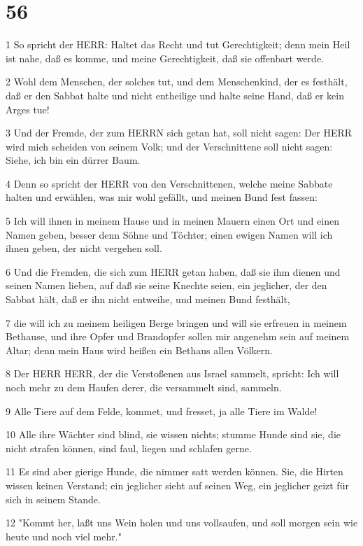 \chapter{56}

\par 1 So spricht der HERR: Haltet das Recht und tut Gerechtigkeit; denn mein Heil ist nahe, daß es komme, und meine Gerechtigkeit, daß sie offenbart werde.
\par 2 Wohl dem Menschen, der solches tut, und dem Menschenkind, der es festhält, daß er den Sabbat halte und nicht entheilige und halte seine Hand, daß er kein Arges tue!
\par 3 Und der Fremde, der zum HERRN sich getan hat, soll nicht sagen: Der HERR wird mich scheiden von seinem Volk; und der Verschnittene soll nicht sagen: Siehe, ich bin ein dürrer Baum.
\par 4 Denn so spricht der HERR von den Verschnittenen, welche meine Sabbate halten und erwählen, was mir wohl gefällt, und meinen Bund fest fassen:
\par 5 Ich will ihnen in meinem Hause und in meinen Mauern einen Ort und einen Namen geben, besser denn Söhne und Töchter; einen ewigen Namen will ich ihnen geben, der nicht vergehen soll.
\par 6 Und die Fremden, die sich zum HERR getan haben, daß sie ihm dienen und seinen Namen lieben, auf daß sie seine Knechte seien, ein jeglicher, der den Sabbat hält, daß er ihn nicht entweihe, und meinen Bund festhält,
\par 7 die will ich zu meinem heiligen Berge bringen und will sie erfreuen in meinem Bethause, und ihre Opfer und Brandopfer sollen mir angenehm sein auf meinem Altar; denn mein Haus wird heißen ein Bethaus allen Völkern.
\par 8 Der HERR HERR, der die Verstoßenen aus Israel sammelt, spricht: Ich will noch mehr zu dem Haufen derer, die versammelt sind, sammeln.
\par 9 Alle Tiere auf dem Felde, kommet, und fresset, ja alle Tiere im Walde!
\par 10 Alle ihre Wächter sind blind, sie wissen nichts; stumme Hunde sind sie, die nicht strafen können, sind faul, liegen und schlafen gerne.
\par 11 Es sind aber gierige Hunde, die nimmer satt werden können. Sie, die Hirten wissen keinen Verstand; ein jeglicher sieht auf seinen Weg, ein jeglicher geizt für sich in seinem Stande.
\par 12 "Kommt her, laßt uns Wein holen und uns vollsaufen, und soll morgen sein wie heute und noch viel mehr."

